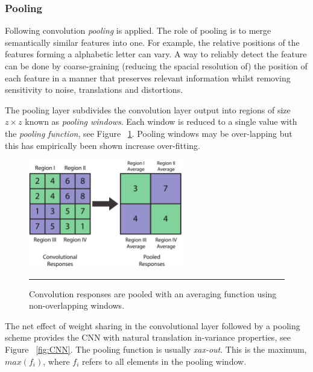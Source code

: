 \subsubsection{Pooling}
Following convolution \textit{pooling} is applied.
The role of pooling is to merge semantically similar features into one.
For example, the relative positions of the features forming a alphabetic letter can vary.
A way to reliably detect the feature can be done by coarse-graining (reducing the spacial resolution of) the position of each feature in a manner that preserves relevant information whilst removing sensitivity to noise, translations and distortions\citep{dengthree}\citep{lecun1995convolutional}\citep{bengio2009advances}.

The pooling layer subdivides the convolution layer output into regions of size $z \times z$ known as \textit{pooling windows}\citep{chen2014big}. 
Each window is reduced to a single value with the \textit{pooling function}, see Figure ~\ref{fig:Pooling}.
Pooling windows may be over-lapping but this has empirically been shown increase over-fitting\citep{bengio2009advances}\citep{krizhevsky2012imagenet}.

\begin{figure}[htbp]
	\centering
		\includegraphics[width = 0.6\textwidth]{./Figures/convolution_end_to_end_recognition_with_cnns.jpg} %
		\rule{35em}{0.5pt}
	\caption[Pooling]{Convolution responses are pooled with an averaging function using non-overlapping windows.}
	\label{fig:Pooling}
\end{figure}

The net effect of weight sharing in the convolutional layer followed by a pooling scheme provides the CNN with natural translation in-variance properties\citep{dengthree}, see Figure ~\ref{fig:CNN}.
The pooling function is usually \textit{xax-out}.
This is the maximum, $max(f_i)$, where $f_i$ refers to all elements in the pooling window\citep{bengio2009advances}\citep{lecun2010convolutional}.

